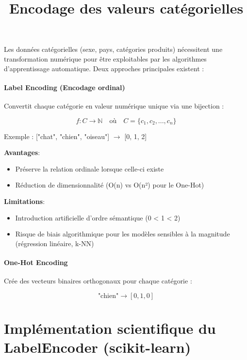 \documentclass{article}
\title{Encodage des valeurs catégorielles}
\author{}
\date{}
\begin{document}
\maketitle

Les données catégorielles (sexe, pays, catégories produits) nécessitent une transformation numérique pour être exploitables par les algorithmes d'apprentissage automatique. Deux approches principales existent :

\paragraph*{Label Encoding (Encodage ordinal)}

Convertit chaque catégorie en valeur numérique unique via une bijection :

\begin{equation}
f: C \rightarrow \mathbb{N} \quad \text{où} \quad C = \{c_1, c_2, ..., c_n\}
\end{equation}

Exemple : ["chat", "chien", "oiseau"] $\rightarrow$ [0, 1, 2]

\textbf{Avantages}: \\
\begin{itemize}
\item Préserve la relation ordinale lorsque celle-ci existe
\item Réduction de dimensionnalité (O(n) vs O(n²) pour le One-Hot)
\end{itemize}

\textbf{Limitations}: \\
\begin{itemize}
\item Introduction artificielle d'ordre sémantique (0 < 1 < 2)
\item Risque de biais algorithmique pour les modèles sensibles à la magnitude (régression linéaire, k-NN)
\end{itemize}

\paragraph*{One-Hot Encoding}

Crée des vecteurs binaires orthogonaux pour chaque catégorie :

\begin{equation}
\text{"chien"} \rightarrow [0, 1, 0]
\end{equation}

\section{Implémentation scientifique du LabelEncoder (scikit-learn)}
\end{document}
